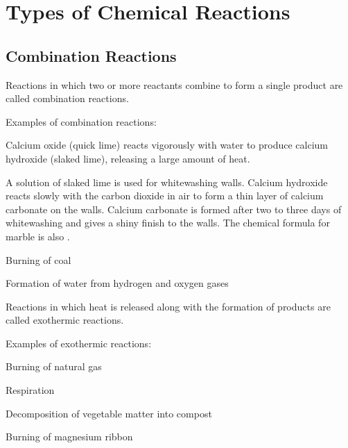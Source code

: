 \section{Types of Chemical Reactions}

\subsection{Combination Reactions}

\begin{outline}
    \1 Reactions in which two or more reactants combine to form a single product are called combination reactions. 

    \1 Examples of combination reactions:
    
    \2 Calcium oxide (quick lime) reacts vigorously with water to produce calcium hydroxide (slaked lime), releasing a large amount of heat.\\

    \begin{remark}
        A solution of slaked lime is used for whitewashing walls. Calcium hydroxide reacts slowly with the carbon dioxide in air to form a thin layer of calcium carbonate on the walls. Calcium carbonate is formed after two to three days of whitewashing and gives a shiny finish to the walls. The chemical formula for marble is also \textup{}.

        \textup{}
    \end{remark}

    \2 Burning of coal\\

    \2 Formation of water from hydrogen and oxygen gases\\

    \1 Reactions in which heat is released along with the formation of products are called exothermic reactions.

    \1 Examples of exothermic reactions:

    \2 Burning of natural gas\\
    
    \2 Respiration \\

    \2 Decomposition of vegetable matter into compost

    \2 Burning of magnesium ribbon
\end{outline}

